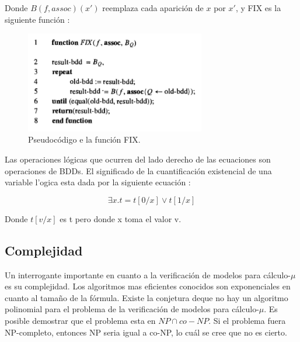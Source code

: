 Donde $B(f,assoc)(x')$ reemplaza cada aparición de $x$ por $x'$, y FIX es la siguiente función \cite{Clarke:1}:
\begin{figure}[H]
  \centering
  \includegraphics[width=0.7\textwidth]{Figures/fix.png}
  \caption{Pseudocódigo e la función FIX.}
  \label{fig:fix}
\end{figure}

Las operaciones lógicas que ocurren del lado derecho de las ecuaciones son operaciones de BDDs. El significado de la cuantificación existencial de una variable l'ogica esta dada por la siguiente ecuación \cite{Andersen:7} :

\[ \exists x . t = t[0/x] \lor t[1/x]\] 

Donde $t[v/x]$ es t pero donde x toma el valor v.

\subsection{Complejidad}

Un interrogante importante en cuanto a la verificación de modelos para cálculo-$\mu$ es su complejidad. Los algoritmos mas eficientes conocidos son exponenciales en cuanto al tamaño de la fórmula. Existe la conjetura\cite{Clarke:1} deque no hay un algoritmo polinomial para el problema de la verificación de modelos para cálculo-$\mu$. Es posible demostrar que el problema esta en $NP \cap co-NP$. Si el problema fuera NP-completo, entonces NP seria igual a co-NP, lo cuál se cree que no es cierto.
